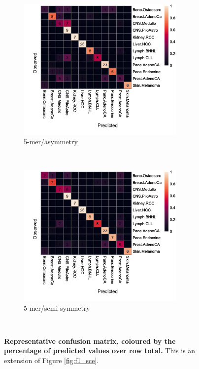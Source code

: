 \begin{figure}[ht!]
    \begin{subfigure}{.5\textwidth}
    \centering
    \includegraphics[width=0.9\textwidth,height=0.8\textwidth]{graphics/confusion_matrix_5mer.png}
    \caption{5-mer/asymmetry}
    \label{fig:confusion_5mer}
    \end{subfigure}
    ~
    \begin{subfigure}{.5\textwidth}
    \centering
    \includegraphics[width=0.9\textwidth,height=0.8\textwidth]{graphics/confusion_matrix_symmetric_5mer.png}
    \caption{5-mer/semi-symmetry}
    \label{fig:confusion_5mer_symmetric}
    \end{subfigure} \\
    
    \caption{\textbf{Representative confusion matrix, coloured by the percentage of predicted values over row total.} This is an extension of Figure \ref{fig:f1_sce}.}
    \label{fig:apdx_ml_sce}
\end{figure}